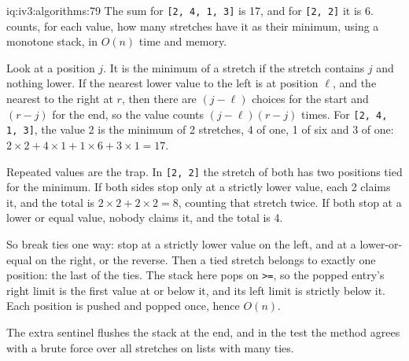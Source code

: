 \begin{solution}{iq:iv3:algorithms:79}
The sum for \texttt{[2, 4, 1, 3]} is 17, and for \texttt{[2, 2]} it is 6.  counts, for each value, how many stretches have it as their minimum, using a monotone stack, in $O(n)$ time and memory.
\label{lst:iv3:al:summins}

Look at a position $j$. It is the minimum of a stretch if the stretch contains $j$ and nothing lower. If the nearest lower value to the left is at position $\ell$, and the nearest to the right at $r$, then there are $(j - \ell)$ choices for the start and $(r - j)$ for the end, so the value counts $(j - \ell)(r - j)$ times. For \texttt{[2, 4, 1, 3]}, the value 2 is the minimum of 2 stretches, 4 of one, 1 of six and 3 of one: $2 \times 2 + 4 \times 1 + 1 \times 6 + 3 \times 1 = 17$.

Repeated values are the trap. In \texttt{[2, 2]} the stretch of both has two positions tied for the minimum. If both sides stop only at a strictly lower value, each 2 claims it, and the total is $2 \times 2 + 2 \times 2 = 8$, counting that stretch twice. If both stop at a lower or equal value, nobody claims it, and the total is 4.

So break ties one way: stop at a strictly lower value on the left, and at a lower-or-equal on the right, or the reverse. Then a tied stretch belongs to exactly one position: the last of the ties. The stack here pops on \texttt{>=}, so the popped entry's right limit is the first value at or below it, and its left limit is strictly below it. Each position is pushed and popped once, hence $O(n)$.

The extra sentinel flushes the stack at the end, and in the test the method agrees with a brute force over all stretches on lists with many ties.

\end{solution}

